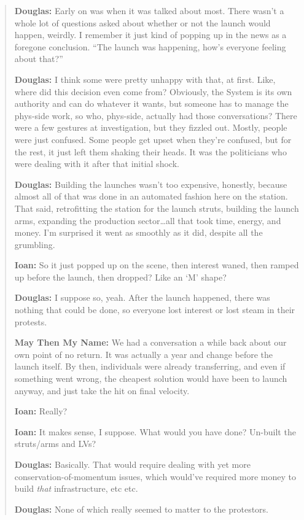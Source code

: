 \begin{quote}
\textbf{Douglas:} Early on was when it was talked about most. There wasn't a whole lot of questions asked about whether or not the launch would happen, weirdly. I remember it just kind of popping up in the news as a foregone conclusion. ``The launch was happening, how's everyone feeling about that?''

\textbf{Douglas:} I think some were pretty unhappy with that, at first. Like, where did this decision even come from? Obviously, the System is its own authority and can do whatever it wants, but someone has to manage the phys-side work, so who, phys-side, actually had those conversations? There were a few gestures at investigation, but they fizzled out. Mostly, people were just confused. Some people get upset when they're confused, but for the rest, it just left them shaking their heads. It was the politicians who were dealing with it after that initial shock.

\textbf{Douglas:} Building the launches wasn't too expensive, honestly, because almost all of that was done in an automated fashion here on the station. That said, retrofitting the station for the launch struts, building the launch arms, expanding the production sector\ldots all that took time, energy, and money. I'm surprised it went as smoothly as it did, despite all the grumbling.

\textbf{Ioan:} So it just popped up on the scene, then interest waned, then ramped up before the launch, then dropped? Like an `M' shape?

\textbf{Douglas:} I suppose so, yeah. After the launch happened, there was nothing that could be done, so everyone lost interest or lost steam in their protests.

\textbf{May Then My Name:} We had a conversation a while back about our own point of no return. It was actually a year and change before the launch itself. By then, individuals were already transferring, and even if something went wrong, the cheapest solution would have been to launch anyway, and just take the hit on final velocity.

\textbf{Ioan:} Really?

\textbf{Ioan:} It makes sense, I suppose. What would you have done? Un-built the struts/arms and LVs?

\textbf{Douglas:} Basically. That would require dealing with yet more conservation-of-momentum issues, which would've required more money to build \emph{that} infrastructure, etc etc.

\textbf{Douglas:} None of which really seemed to matter to the protestors.


\end{quote}
